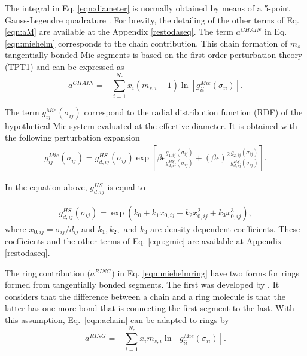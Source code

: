 The integral in Eq. \eqref{eqn:diameter} is normally obtained by means of a 5-point Gauss-Legendre quadrature \cite{papa2014}. For brevity, the detailing of the other terms of Eq. \eqref{eqn:aM} are available at the Appendix \ref{restodaseq}. The term $a^{CHAIN}$ in Eq. \ref{eqn:miehelm} corresponds to the chain contribution. This chain formation of $m_{s}$ tangentially bonded Mie segments is based on the first-order perturbation theory (TPT1)  \cite{papa2014} and can be expressed as
\begin{equation}
a^{CHAIN} =-\sum_{i=1}^{N_{c}} x_{i}(m_{s,i} - 1)\ln \left [ g_{ii}^{Mie}(\sigma_{ii}) \right] .
\label{eqn:achain}
\end{equation}

The term $g_{ij}^{Mie}(\sigma_{ij})$ correspond to the radial distribution function (RDF) of the hypothetical Mie system evaluated at the effective diameter. It is obtained with the following perturbation expansion
\begin{equation}
\begin{aligned}
g_{ij}^{Mie}(\sigma_{ij}) =g_{d,ij}^{HS}(\sigma_{ij})\exp \left [\beta\epsilon \frac{g_{1,ij}(\sigma_{ij})}{g_{d,ij}^{HS}(\sigma_{ij})} + (\beta\epsilon)^{2} \frac{g_{2,ij}(\sigma_{ij})}{g_{d,ij}^{HS}(\sigma_{ij})} \right] .
\end{aligned}
\label{eqn:gmie}
\end{equation}


In the equation above, $g_{d,ij}^{HS}$ is equal to 

\begin{equation}
\begin{aligned}
g_{d,ij}^{HS}(\sigma_{ij}) = \exp (k_{0} + k_{1} x_{0,ij} + k_{2} x_{0,ij}^{2} + k_{3} x_{0,ij}^{3}) ,
\end{aligned}
\label{eqn:ghs}
\end{equation}
where $x_{0,ij} = \sigma_{ij}/d_{ij}$ and $k_{1}, k_{2},$ and $k_{3}$ are density dependent coefficients. These coefficients and the other terms of Eq. \ref{eqn:gmie} are available at Appendix \ref{restodaseq}.  

The ring contribution ($a^{RING}$) in Eq. \ref{eqn:miehelmring} have two forms for rings formed from tangentially bonded segments. The first was developed by . It considers that the difference between a chain and a ring molecule is that the latter has one more bond that is connecting the first segment to the last. With this assumption, Eq.~\eqref{eqn:achain} can be adapted to rings by
\begin{equation}
a^{RING} =-\sum_{i=1}^{N_{c}} x_{i}m_{s,i}\ln[g_{ii}^{Mie}(\sigma_{ii})] .
\label{eqn:aringlafitte}
\end{equation}


